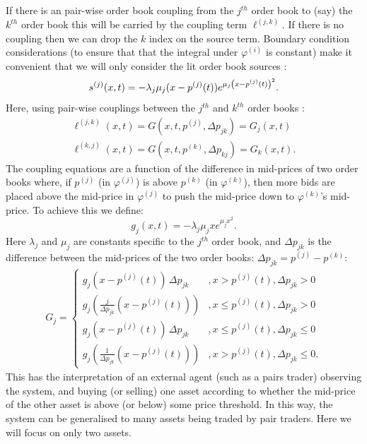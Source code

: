 \documentclass[5p,final]{elsarticle}
\begin{document}
If there is an pair-wise order book coupling from the $j^{th}$ order book to (say) the $k^{th}$ order book this will be carried by the coupling term $\ell^{(j,k)}$. If there is no coupling then we can drop the $k$ index on the source term. Boundary condition considerations (to ensure that that the integral under $\varphi^{(i)}$ is constant) make it convenient that we will only consider the lit order book sources \citep{Gant2022b,DianaGebbie2025,BauerDianaGebbie2024}:
\begin{equation}\label{eq:source-term}
s^{(j)}(x,t) = - \lambda_j \mu_j (x - p^{(j)}(t)) e^{\mu_j\left(x - p^{(j)}(t)\right)^2}. \\
\end{equation}
Here, using pair-wise couplings between the $j^{th}$ and $k^{th}$ order books \cite{diana2023-zivahub}:
\begin{equation}
\begin{aligned} 
    \ell^{(j,k)}(x,t)=G(x,t,p^{(j)},\Delta p_{jk}) = G_j(x,t) \\
    \ell^{(k,j)}(x,t)=G(x,t,p^{(k)},\Delta p_{kj}) = G_k(x,t). \label{eq:ell-crosscoupling} 
\end{aligned}
\end{equation}
The coupling equations are a function of the difference in mid-prices of two order books where, if $p^{(j)}$ (in $\varphi^{(j)}$) is above $p^{(k)}$ (in $\varphi^{(k)}$), then more bids are placed above the mid-price in $\varphi^{(j)}$ to push the mid-price down to $\varphi^{(k)}$'s mid-price. To achieve this we define:
\begin{equation}
g_j(x,t) = - \lambda_j \mu_j x e^{\mu_j x^2}.
\end{equation} 
Here $\lambda_j$ and $\mu_j$ are constants specific to the $j^{th}$ order book, and $\Delta p_{jk}$ is the difference between the mid-prices of the two order books: $\Delta p_{jk} = p^{(j)} - p^{(k)}$:
\begin{equation}
\begin{aligned}
    G_j = 
   \left\{
    \begin{array}{ll}
        g_j\left(x-p^{(j)}(t)\right)\, \Delta p_{jk} &,x > p^{(j)}(t), \Delta p_{jk} > 0\\
        g_j\left(\frac{j}{\Delta p_{jk}}(x-p^{(j)}(t))\right) &,x \leq p^{(j)}(t), \Delta p_{jk} > 0 \\
        g_j\left(x-p^{(j)}(t)\right)\, \Delta p_{jk} &,x \leq p^{(j)}(t), \Delta p_{jk} \leq 0\\
        g_j\left(\frac{1}{\Delta p_{jk}}(x-p^{(j)}(t))\right) &,x > p^{(j)}(t), \Delta p_{jk} \leq 0.
    \end{array}
    \right.  \label{eq:G-coupling}
\end{aligned} \nonumber
\end{equation}
This has the interpretation of an external agent (such as a pairs trader) observing the system, and buying (or selling) one asset according to whether the mid-price of the other asset is above (or below) some price threshold. In this way, the system can be generalised to many assets being traded by pair traders. Here we will focus on only two assets. 
\end{document}
